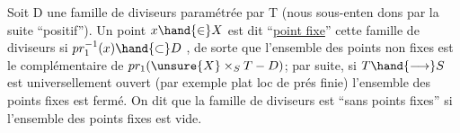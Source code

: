 Soit D une famille de diviseurs  paramétrée par T (nous sous-enten%
dons par la suite ``positif''). Un point $x\hand{\in} X$ est dit ``\uline{point fixe}'' 
cette famille de diviseurs si $pr_1^{-1}(x)\hand{\subset} D$ , de sorte que l'ensemble des
points non fixes est le complémentaire de $pr_1(\unsure{X}\times_S T - D)$; par suite, si
$T\hand{\longrightarrow} S$ est universellement ouvert (par exemple plat loc de prés finie)
l'ensemble des points fixes est fermé. On dit que la famille de diviseurs
est ``sans points fixes'' si l'ensemble  des points fixes est vide.

